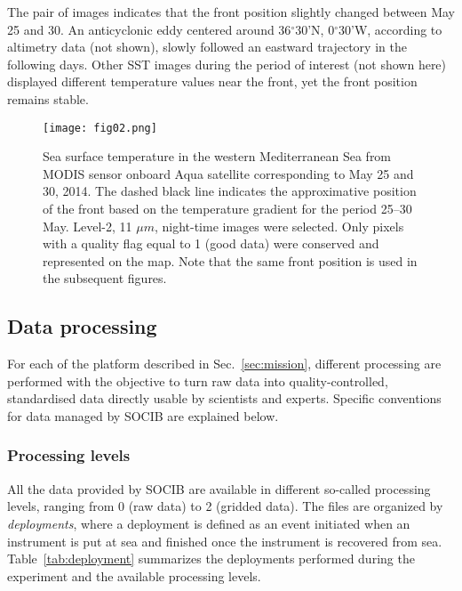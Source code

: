 \documentclass[essd,manuscript]{copernicus}
\begin{document}
The pair of images indicates that the front position slightly changed between May 25 and 30. An anticyclonic eddy centered around 36$^{\circ}$30'N, 0$^{\circ}$30'W, according to altimetry data (not shown), slowly followed an eastward trajectory in the following days. Other SST images during the period of interest (not shown here) displayed different temperature values near the front, yet the front position remains stable. 

\begin{figure}[t]
\texttt{[image: fig02.png]}
\caption{Sea surface temperature in the western Mediterranean Sea from MODIS sensor onboard Aqua satellite corresponding to May 25 and 30, 2014. The dashed black line indicates the approximative position of the front based on the temperature gradient for the period 25--30 May. Level-2, 11 $\mu m$, night-time images were selected. Only pixels with a quality flag equal to 1 (good data) were conserved and represented on the map. Note that the same front position is used in the subsequent figures.\label{fig2:SST}}
\end{figure}

\subsection{Data processing\label{sec:processing}}

For each of the platform described in Sec.~\ref{sec:mission}, different processing are performed with the objective to turn raw data into quality-controlled, standardised data directly usable by scientists and experts. Specific conventions for data managed by SOCIB are explained below.

\subsubsection{Processing levels}

All the data provided by SOCIB are available in different so-called processing levels, ranging from 0 (raw data) to 2 (gridded data). The files are organized by \textit{deployments}, where a deployment is defined as an event initiated when an instrument is put at sea and finished once the instrument is recovered from sea. Table~\ref{tab:deployment} summarizes the deployments performed during the experiment and the available processing levels.
\end{document}
